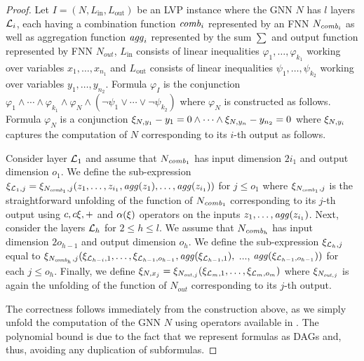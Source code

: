 \begin{proof}
    Let $I = (N, L_{\text{in}}, L_{\text{out}})$ be an LVP instance where the GNN $N$ has $l$ layers $\mathcal{L}_i$, each having a combination function $\mathit{comb}_i$
    represented by an FNN $N_{\mathit{comb}_i}$ as well as aggregation function $\mathit{agg}_i$ represented by the sum $\sum$ and output function represented by FNN $N_{\mathit{out}}$, $L_{\text{in}}$ consists of linear inequalities
    $\varphi_1, \dotsc, \varphi_{k_1}$ working over variables $x_1, \dotsc, x_{n_1}$ and $L_{\text{out}}$ consists of linear inequalities
    $\psi_1, \dotsc, \psi_{k_2}$ working over variables $y_1, \dotsc, y_{n_2}$.
    Formula $\varphi_I$ is the conjunction $\varphi_1 \land \dotsb \land \varphi_{k_1}\land \varphi_N \land (\neg\psi_1 \lor \dotsb \lor \neg\psi_{k_2})$ where $\varphi_N$ is constructed as follows. 
    Formula $\varphi_N$ is a conjunction
    $\xi_{N,y_1} - y_1 = 0 \land \dotsb \land \xi_{N,y_n} - y_{n_2} = 0$ where $\xi_{N, y_i}$ captures the computation of $N$ corresponding to its $i$-th
    output as follows.

    Consider layer $\mathcal{L}_1$ and assume that $N_{\mathit{comb}_1}$ has input dimension $2i_1$ and output dimension $o_1$. We define the sub-expression $\xi_{\mathcal{L}_1, j}= \xi_{N_{\mathit{comb}_1},j}(z_1, \dotsc, z_{i_1}, \mathit{agg}(z_1), \dotsc, \mathit{agg}(z_{i_1}))$ for $j \leq o_1$ where $\xi_{N_{\mathit{comb}_1},j}$ is the straightforward unfolding of the function of $N_{\mathit{comb}_1}$ corresponding to its $j$-th output using $c, c\xi, +$ and $\alpha(\xi)$ operators on the inputs 
    $z_1, \dotsc, \mathit{agg}(z_{i_1})$. Next, consider the
    layers $\mathcal{L}_h$ for $2 \leq h \leq l$. We assume that $N_{\mathit{comb}_h}$ has input dimension $2o_{h-1}$ and output dimension $o_h$.
    We define the sub-expression $\xi_{\mathcal{L}_h, j}$ equal to
    $\xi_{N_{\mathit{comb}_h},j}(\xi_{\mathcal{L}_{h-i},1}, \dotsc, \xi_{\mathcal{L}_{h-1},o_{h-1}}, \mathit{agg}(\xi_{\mathcal{L}_{h-1},1}),$ $\dotsc$, $\mathit{agg}(\xi_{\mathcal{L}_{h-1},o_{h-1}}))$ for each $j \leq o_h$. Finally, we define $\xi_{N,x_j} = \xi_{N_{\mathit{out}, j}}(\xi_{\mathcal{L}_m, 1}, \dotsc, \xi_{\mathcal{L}_m, o_m})$ where $\xi_{N_{\mathit{out}, j}}$ is again the unfolding of the function of $N_{\mathit{out}}$ 
    corresponding to its $j$-th output.

    The correctness follows immediately from the construction above, as we simply unfold the computation of the GNN $N$ using operators available
    in \thelogic{}. The polynomial bound is due to the fact that we represent formulas as DAGs and, thus, avoiding any duplication of subformulas.
\end{proof}


